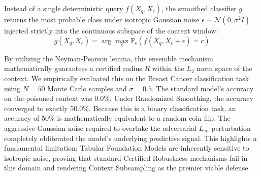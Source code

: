 Instead of a single deterministic query $f(X_q, X_c)$, the smoothed classifier $g$ returns the most probable class under isotropic Gaussian noise $\epsilon \sim \mathcal{N}(0, \sigma^2 I)$ injected strictly into the continuous subspace of the context window:
\begin{equation}
    g(X_q, X_c) = \arg\max_c \mathbb{P}_{\epsilon} \left(f(X_q, X_c + \epsilon) = c\right)
\end{equation}

By utilizing the Neyman-Pearson lemma, this ensemble mechanism mathematically guarantees a certified radius $R$ within the $L_2$ norm space of the context. We empirically evaluated this on the Breast Cancer classification task using $N=50$ Monte Carlo samples and $\sigma=0.5$. The standard model's accuracy on the poisoned context was $0.0\%$. Under Randomized Smoothing, the accuracy converged to exactly $50.0\%$. Because this is a binary classification task, an accuracy of $50\%$ is mathematically equivalent to a random coin flip. The aggressive Gaussian noise required to overtake the adversarial $L_\infty$ perturbation completely obliterated the model's underlying predictive signal. This highlights a fundamental limitation: Tabular Foundation Models are inherently sensitive to isotropic noise, proving that standard Certified Robustness mechanisms fail in this domain and rendering Context Subsampling as the premier viable defense.
